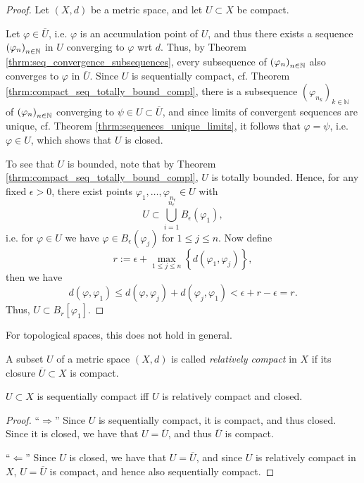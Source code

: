 \begin{proof}
	Let $(X, d)$ be a metric space, and let $U\subset X$ be compact. 
	
	Let $\varphi\in \overline{U}$, i.e. $\varphi$ is an accumulation point of $U$, and thus there exists a sequence $\seq[\varphi_n]$ in $U$ converging to $\varphi$ wrt $d$. Thus, by Theorem \ref{thrm:seq_convergence_subsequences}, every subsequence of $\seq[\varphi_n]$ also converges to $\varphi$ in $\overline{U}$. Since $U$ is sequentially compact, cf. Theorem \ref{thrm:compact_seq_totally_bound_compl}, there is a subsequence $\left(\varphi_{n_k}\right)_{k\in\mathbb N}$ of $\seq[\varphi_n]$ converging to $\psi\in U\subset \overline{U}$, and since limits of convergent sequences are unique, cf. Theorem \ref{thrm:sequences_unique_limits}, it follows that $\varphi=\psi$, i.e. $\varphi\in U$, which shows that $U$ is closed.
	
	To see that $U$ is bounded, note that by Theorem \ref{thrm:compact_seq_totally_bound_compl}, $U$ is totally bounded. Hence, for any fixed $\epsilon > 0$, there exist points $\varphi_1, \dots, \varphi_{n_{\epsilon}}\in U$ with $$U\subset \bigcup_{i = 1}^{n_{\epsilon}}B_{\epsilon}(\varphi_1),$$ i.e. for $\varphi\in U$ we have $\varphi\in B_{\epsilon}(\varphi_j)$ for $1\leq j\leq n$. Now define
	$$r := \epsilon + \max_{1\leq j\leq n}\left\{ d(\varphi_1, \varphi_j)\right\},$$
	then we have
	$$d(\varphi, \varphi_1) \leq d(\varphi, \varphi_j) + d(\varphi_j, \varphi_1) < \epsilon + r - \epsilon = r.$$
	Thus, $U\subset B_{r}[\varphi_1]$.
\end{proof}

\begin{remark}
	For topological spaces, this does not hold in general.
\end{remark}

\begin{defn}
	A subset $U$ of a metric space $(X, d)$ is called \textit{relatively compact} in $X$ if its closure $\overline{U}\subset X$ is compact.
\end{defn}

\begin{theorem}
	$U\subset X$ is sequentially compact iff $U$ is relatively compact and closed.
\end{theorem}

\begin{proof}
	\enquote{$\Longrightarrow$} Since $U$ is sequentially compact, it is compact, and thus closed. Since it is closed, we have that $U = \overline{U}$, and thus $\overline{U}$ is compact.
	
	\enquote{$\Longleftarrow$} Since $U$ is closed, we have that $U = \overline{U}$, and since $U$ is relatively compact in $X$, $U = \overline{U}$ is compact, and hence also sequentially compact.
\end{proof}

